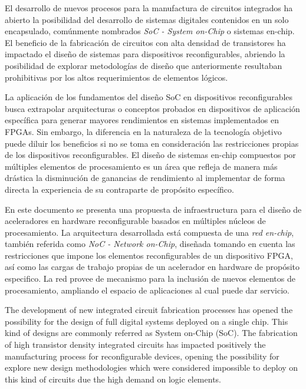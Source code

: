 
El desarrollo de nuevos procesos para la manufactura de circuitos integrados ha abierto la posibilidad del desarrollo de sistemas digitales contenidos en un solo encapsulado, comúnmente nombrados \textit{SoC - System on-Chip} o sistemas en-chip. El beneficio de la fabricación de circuitos con alta densidad de transistores ha impactado el diseño de sistemas para dispositivos reconfigurables, abriendo la posibilidad de explorar metodologías de diseño que anteriormente resultaban prohibitivas por los altos requerimientos de elementos lógicos.

La aplicación de los fundamentos del diseño SoC en dispositivos reconfigurables busca extrapolar arquitecturas o conceptos probados en dispositivos de aplicación específica para generar mayores rendimientos en sistemas implementados en FPGAs. Sin embargo, la diferencia en la naturaleza de la tecnología objetivo puede diluir los beneficios si no se toma en consideración las restricciones propias de los dispositivos reconfigurables. El diseño de sistemas en-chip compuestos por múltiples elementos de procesamiento es un área que refleja de manera más drástica la disminución de ganancias de rendimiento al implementar de forma directa la experiencia de su contraparte de propósito específico.

En este documento se presenta una propuesta de infraestructura para el diseño de aceleradores en hardware reconfigurable basados en múltiples núcleos de procesamiento. La arquitectura desarrollada está compuesta de una \textit{red en-chip}, también referida como \textit{NoC - Network on-Chip}, diseñada tomando en cuenta las restricciones que impone los elementos reconfigurables de un dispositivo FPGA, así como las cargas de trabajo propias de un acelerador en hardware de propósito especifico. La red provee de mecanismo para la inclusión de nuevos elementos de procesamiento, ampliando el espacio de aplicaciones al cual puede dar servicio.

\clearpage

The development of new integrated circuit fabrication processes has opened the possibility for the design of full digital systems deployed on a single chip. This kind of designs are commonly referred as System on-Chip (SoC). The fabrication of high transistor density integrated circuits has impacted positively the manufacturing process for reconfigurable devices, opening the possibility for explore new design methodologies which were considered impossible to deploy on this kind of circuits due the high demand on logic elements.

